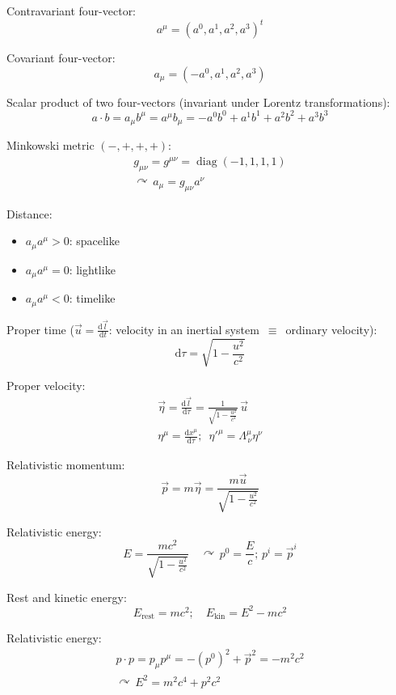 \documentclass[fontsize=11pt,a4paper]{scrartcl}
\DeclareMathOperator{\diag}{diag}
\begin{document}
Contravariant four-vector:
\[
	a^\mu=(a^0,a^1,a^2,a^3)^t
\]

Covariant four-vector:
\[
	a_\mu=(-a^0,a^1,a^2,a^3)
\]

Scalar product of two four-vectors (invariant under Lorentz transformations):
\[
	a\cdot b=a_\mu b^\mu=a^\mu b_\mu=-a^0 b^0+a^1 b^1+a^2 b^2+a^3 b^3
\]

Minkowski metric $(-,+,+,+)$:
\begin{gather*}
	g_{\mu\nu}=g^{\mu\nu}=\diag(-1,1,1,1)\\
	\curvearrowright\,a_\mu=g_{\mu\nu} a^\nu
\end{gather*}

Distance:
\begin{itemize}
	\item $a_\mu a^\mu>0$: spacelike
	\item $a_\mu a^\mu=0$: lightlike
	\item $a_\mu a^\mu<0$: timelike
\end{itemize}

Proper time ($\vec u=\frac{\mathrm{d}\vec l}{\mathrm{d}t}$: velocity in an inertial system $\,\equiv\,$ ordinary velocity):
\[
	\mathrm{d}\tau=\sqrt{1-\frac{u^2}{c^2}}
\]

Proper velocity:
\begin{gather*}
	\vec\eta=\frac{\mathrm{d}\vec l}{\mathrm{d}\tau}=\frac{1}{\sqrt{1-\frac{u^2}{c^2}}}\,\vec u\\
	\eta^\mu=\frac{\mathrm{d}x^\mu}{\mathrm{d}\tau};\,\,\,\eta'^\mu=\Lambda^\mu_{\,\nu}\eta^\nu
\end{gather*}

Relativistic momentum:
\[
	\vec p=m\vec\eta=\frac{m\vec u}{\sqrt{1-\frac{u^2}{c^2}}}
\]

Relativistic energy:
\[
	E=\frac{mc^2}{\sqrt{1-\frac{u^2}{c^2}}}\quad\curvearrowright\,p^0=\frac{E}{c};\,p^i=\vec p^i
\]

Rest and kinetic energy:
\[
	E_\mathrm{rest}=mc^2;\quad E_\mathrm{kin}=E^2-mc^2
\]

Relativistic energy:
\begin{gather*}
	p\cdot p=p_\mu p^\mu=-(p^0)^2+\vec p^2=-m^2c^2\\
	\curvearrowright\,E^2=m^2 c^4+p^2 c^2
\end{gather*}
\end{document}
